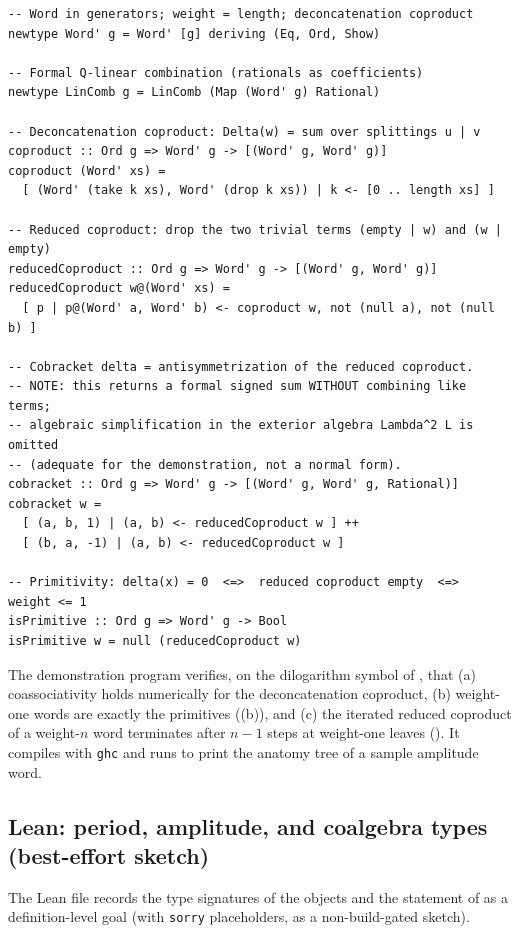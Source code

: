 \documentclass[12pt]{article}
\theoremstyle{definition}
\theoremstyle{remark}
\begin{document}
\begin{verbatim}
-- Word in generators; weight = length; deconcatenation coproduct
newtype Word' g = Word' [g] deriving (Eq, Ord, Show)

-- Formal Q-linear combination (rationals as coefficients)
newtype LinComb g = LinComb (Map (Word' g) Rational)

-- Deconcatenation coproduct: Delta(w) = sum over splittings u | v
coproduct :: Ord g => Word' g -> [(Word' g, Word' g)]
coproduct (Word' xs) =
  [ (Word' (take k xs), Word' (drop k xs)) | k <- [0 .. length xs] ]

-- Reduced coproduct: drop the two trivial terms (empty | w) and (w | empty)
reducedCoproduct :: Ord g => Word' g -> [(Word' g, Word' g)]
reducedCoproduct w@(Word' xs) =
  [ p | p@(Word' a, Word' b) <- coproduct w, not (null a), not (null b) ]

-- Cobracket delta = antisymmetrization of the reduced coproduct.
-- NOTE: this returns a formal signed sum WITHOUT combining like terms;
-- algebraic simplification in the exterior algebra Lambda^2 L is omitted
-- (adequate for the demonstration, not a normal form).
cobracket :: Ord g => Word' g -> [(Word' g, Word' g, Rational)]
cobracket w =
  [ (a, b, 1) | (a, b) <- reducedCoproduct w ] ++
  [ (b, a, -1) | (a, b) <- reducedCoproduct w ]

-- Primitivity: delta(x) = 0  <=>  reduced coproduct empty  <=>  weight <= 1
isPrimitive :: Ord g => Word' g -> Bool
isPrimitive w = null (reducedCoproduct w)
\end{verbatim}

The demonstration program verifies, on the dilogarithm symbol of
, that (a) coassociativity holds numerically for the deconcatenation
coproduct, (b) weight-one words are exactly the primitives ((b)), and
(c) the iterated reduced coproduct of a weight-$n$ word terminates after $n-1$ steps at
weight-one leaves (). It compiles with \texttt{ghc} and runs to print
the anatomy tree of a sample amplitude word.

\subsection{Lean: period, amplitude, and coalgebra types (best-effort sketch)}

The Lean file records the type signatures of the objects and the statement of
 as a definition-level goal (with \texttt{sorry} placeholders, as a
non-build-gated sketch).
\end{document}
